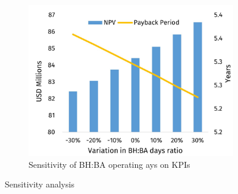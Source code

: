 \begin{figure}
\begin{subfigure}[b]{.45\linewidth}
\includegraphics[width=\linewidth]{chapters/6-economics/figures/Sensitivity_OperatingDays.jpg}
\caption{Sensitivity of BH:BA operating ays on KPIs}\label{Sensitivity_BHBA}
\end{subfigure}

\caption{Sensitivity analysis}
\label{Sensitivity}
\end{figure}
